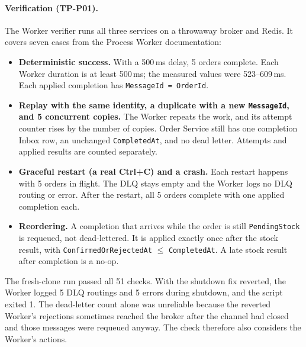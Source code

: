 \documentclass[a4paper]{report}
\begin{document}
\paragraph{Verification (TP-P01).} The Worker verifier runs all three services
on a throwaway broker and Redis. It covers seven cases from the Process Worker
documentation:
\begin{itemize}
  \item \textbf{Deterministic success.} With a 500\,ms delay, 5 orders
    complete. Each Worker duration is at least 500\,ms; the measured values
    were 523--609\,ms. Each applied completion has
    \texttt{MessageId = OrderId}.
  \item \textbf{Replay with the same identity, a duplicate with a new
    \texttt{MessageId}, and 5 concurrent copies.} The Worker repeats the
    work, and its attempt counter rises by the number of copies. Order
    Service still has one completion Inbox row, an unchanged
    \texttt{CompletedAt}, and no dead letter. Attempts and applied results
    are counted separately.
  \item \textbf{Graceful restart (a real Ctrl+C) and a crash.} Each restart
    happens with 5 orders in flight. The DLQ stays empty and the Worker logs
    no DLQ routing or error. After the restart, all 5 orders complete with
    one applied completion each.
  \item \textbf{Reordering.} A completion that arrives while the order is
    still \texttt{PendingStock} is requeued, not dead-lettered. It is applied
    exactly once after the stock result, with
    \texttt{ConfirmedOrRejectedAt} $\le$ \texttt{CompletedAt}. A late stock
    result after completion is a no-op.
\end{itemize}

The fresh-clone run passed all 51 checks. With the shutdown fix reverted,
the Worker logged 5 DLQ routings and 5 errors during shutdown, and the
script exited 1. The dead-letter count alone was unreliable because the
reverted Worker's rejections sometimes reached the broker after the channel
had closed and those messages were requeued anyway. The check therefore also
considers the Worker's actions.
\end{document}
